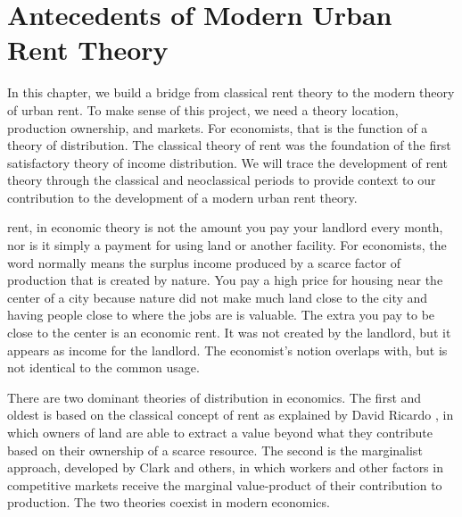 \chapter{Antecedents of Modern Urban Rent Theory} \label{chapter-rent}

 In this chapter, we build a bridge from \gls{classical rent theory} to the modern theory of urban rent. 
To make  sense of this project, we need a theory location, production ownership, and markets. 
For economists, that is the function of a theory of distribution. The classical theory of rent was the foundation of the first satisfactory theory of income distribution. We will  trace the development of rent theory through the classical and neoclassical periods to provide context to our contribution to the development of a modern urban rent theory. 

 
\Gls{rent}, in economic theory is not the amount you pay your landlord every month, nor is it simply a payment for using land or another facility.  For economists, the word normally means the  \gls{surplus} income produced by a scarce factor of production that is created by nature. You pay a high price for housing near the center of a city because nature did not make much land close to the city and having people close to where the jobs are is valuable. The extra you pay to be close to the center is an economic rent. It was not created by the landlord, but it appears as income for the landlord.  The economist's notion overlaps with, but is not identical to the common usage.


There are two dominant theories of \gls{distribution} in economics. The first and oldest is based on the classical concept of rent as explained  by David Ricardo \cite{ricardoEssayInfluenceLow1815}, in which owners of land are able to extract a value beyond what they contribute based on their ownership of a scarce resource. 
The second is the marginalist approach, developed by Clark and others, in which workers and other factors  in competitive markets receive the \gls{marginal value-product} of their contribution to production. The two theories coexist in modern economics.

